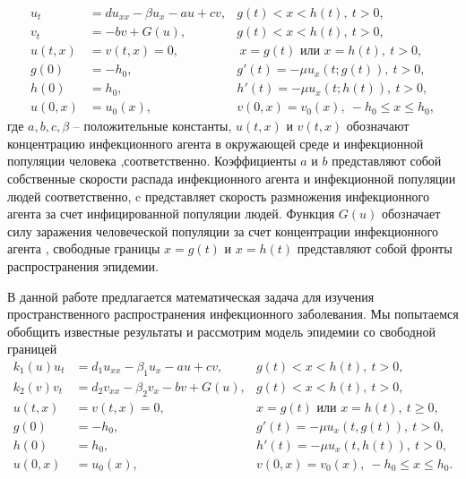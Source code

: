 \begin{align}
\nonumber
u_{t} &= du_{xx} - \beta u_{x} - au + cv,  &  g(t) < x < h(t), \ t > 0,\\
\nonumber
v_{t} &= -bv + G(u),  &      g(t) < x < h(t), \ t > 0,\\
u(t,x) &= v(t,x) = 0, & \ x = g(t) \mbox{ или } x = h(t),  \ t > 0,\\
\nonumber
g(0) &= -h_{0}, & g'(t) = -\mu u_{x}(t; g(t)), \ t > 0,\\
\nonumber
h(0) &= h_{0}, &h'(t) = -\mu u_{x}(t;h(t)), \ t > 0,\\
\nonumber
u(0,x)& = u_{0}(x), &v(0,x) = v_{0}(x), \ -h_{0} \leq x \leq h_{0},
\end{align}
где  $a, b, c , \beta $ --  положительные константы, $u(t,x)$ и $v(t,x)$ обозначают концентрацию инфекционного агента в окружающей среде и инфекционной популяции человека ,соответственно. Коэффициенты $a$ и $b$ представляют собой собственные скорости распада инфекционного агента и инфекционной популяции людей соответственно, c представляет скорость размножения инфекционного агента за счет инфицированной популяции людей. Функция $G(u)$ обозначает силу заражения человеческой популяции за счет концентрации инфекционного агента ,  свободные границы $x = g(t)$ и $x = h(t)$ представляют собой фронты распространения эпидемии.

В данной  работе предлагается математическая задача для изучения пространственного распространения инфекционного заболевания. Мы попытаемся обобщить известные результаты и  рассмотрим  модель эпидемии со свободной границей
\begin{align}
\nonumber
k_{1}(u) u_{t} &= d_{1}u_{xx} - \beta_{1}u_{x} - au + cv, &  g(t) < x < h(t), \ t > 0,\\
\nonumber
k_{2}(v) v_t &= d_2v_{xx}- \beta_{2}v_x - bv + G(u),  &   g(t) < x < h(t), \ t > 0,\\
u(t,x) &= v(t,x) = 0,                                   & x = g(t) \text{ или } x = h(t), \ t \geq 0,\\
\nonumber
g(0) &= -h_{0},                                     &g'(t) = -\mu u_{x}(t, g(t)), \ t > 0,\\
\nonumber
 h(0) &= h_{0},                         & h'(t) = -\mu u_x(t, h(t)) , \ t > 0,\\
\nonumber
u(0,x) &= u_{0}(x),                     & v(0,x) = v_{0}(x), \ -h_{0} \leq x \leq h_{0}.
\end{align}

